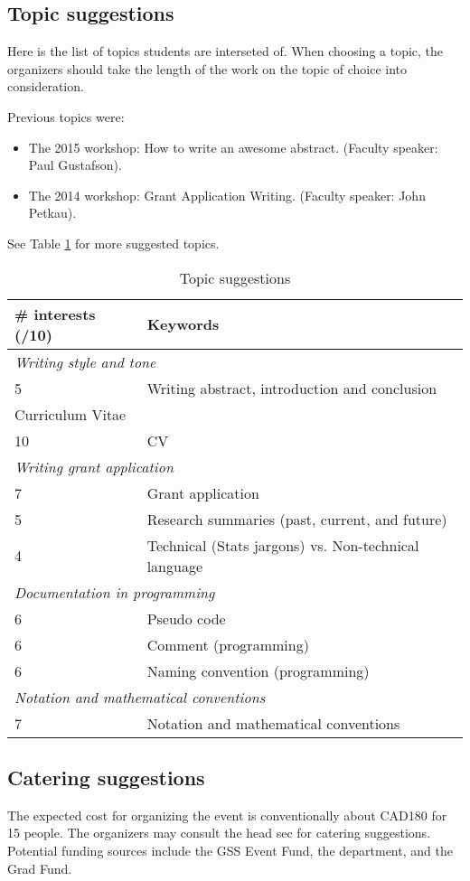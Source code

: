 \documentclass[11pt,a4paper]{article}
\begin{document}
\subsection{Topic suggestions}\label{sec:topics}

Here is the list of topics students are interseted of. When choosing a topic, the organizers should take the length of the work on the topic of choice into consideration. 

Previous topics were:

\begin{itemize}
\item The 2015 workshop: How to write an awesome abstract. (Faculty speaker: Paul Gustafson).
\item The 2014 workshop: Grant Application Writing. (Faculty speaker: John Petkau).
\end{itemize}

See Table \ref{tab:topics} for more suggested topics.

\begin{table}[thb]
\centering
\caption{Topic suggestions}\label{tab:topics}
\begin{tabular}{ll}
\hline
\# interests (/10) & Keywords \\
\hline
\multicolumn{2}{l}{\emph{Writing style and tone}}\\
5	& Writing abstract, introduction and conclusion\\
\multicolumn{2}{l}{Curriculum Vitae }\\
10	& CV \\
\multicolumn{2}{l}{\emph{Writing grant application}}\\
7	& Grant application \\
5	& Research summaries (past, current, and future) \\
4	& Technical (Stats jargons) vs. Non-technical language \\
\multicolumn{2}{l}{\emph{Documentation in programming}}\\
6	& Pseudo code\\
6	& Comment (programming)\\
6	& Naming convention (programming)\\
\multicolumn{2}{l}{\emph{Notation and mathematical conventions}}\\
7	& Notation and mathematical conventions\\
\hline
\end{tabular}
\end{table}


\subsection{Catering suggestions}\label{sec:catering}

The expected cost for organizing the event is conventionally about CAD180 for 15 people. The organizers may consult the head sec for catering suggestions. Potential funding sources include the GSS Event Fund, the department, and the Grad Fund. 
\end{document}
